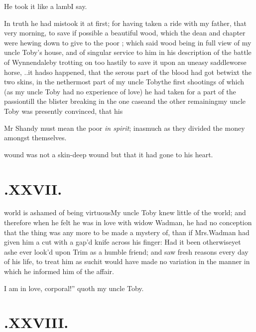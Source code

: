 \documentclass[twoside]{article}
\begin{document}
He took it like a lamb\tsh I say.


In truth he had mistook it at first; for having taken a ride with my father, that
very morning, to save if possible a beautiful wood, which the dean and chapter were
hewing down to give to the poor \fnast;\break
which said wood
being in full view of my uncle Toby’s house, and of singular service to him in his
description of the battle of Wynnendale\tsk by trotting on too hastily to save it\tsh
upon an uneasy saddle\tsh worse horse, \etc \etc .\@ .\@  it had\break so happened, that the
serous part of the blood had got betwixt the two skins, in the nethermost part of my
uncle Toby\break\tsk the first shootings of which (as my uncle Toby had no
experience of love) he had taken for a part of the passion\tsk\break till the blister
breaking in the one case\tsk\break and the other remaining\tsk my uncle Toby was presently
convinced, that his{\par}

\bgroup\small
\indent\fnast\enspace Mr Shandy must mean the poor \textit{in spirit};
inasmuch as they divided the money amongst themselves.
\par\egroup
{}\eject

\noindent wound was not a skin-deep wound\tsh\break
but that it had gone to his heart.


\section{.\enspace XXVII.}

 world is ashamed of being
vir\-tuous\tsh My uncle Toby knew little of the
world; and therefore when he felt he was in love with widow
Wadman, he had no conception that the thing was any more to
be made a mystery of, than if Mrs.\@ Wadman had given him a
cut with a gap’d knife across his finger: Had it been
otherwise\tsh yet as\break he ever look’d upon Trim
as a humble friend; and saw fresh reasons every day of his life, to
treat him as such\tsh it would have made no variation in
the manner in which he informed him of the\break
affair.\etp{}

\lqq I am in love, corporal!” quoth my uncle
Toby.

\section{.\enspace XXVIII.}
\end{document}
